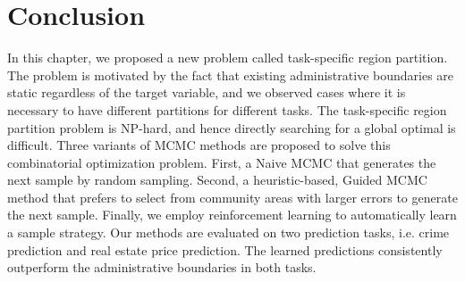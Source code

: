 \section{Conclusion}
\label{ch4-sec:conclusion}


In this chapter, we proposed a new problem called task-specific region partition. The problem is motivated by the fact that existing administrative boundaries are static regardless of the target variable, and we observed cases where it is necessary to have different partitions for different tasks. The task-specific region partition problem is NP-hard, and hence directly searching for a global optimal is difficult. Three variants of MCMC methods are proposed to solve this combinatorial optimization problem. First, a Naive MCMC that generates the next sample by random sampling. Second, a heuristic-based, Guided MCMC method that prefers to select from community areas with larger errors to generate the next sample. Finally, we employ reinforcement learning to automatically learn a sample strategy. Our methods are evaluated on two prediction tasks, i.e. crime prediction and real estate price prediction. The learned predictions consistently outperform the administrative boundaries in both tasks.